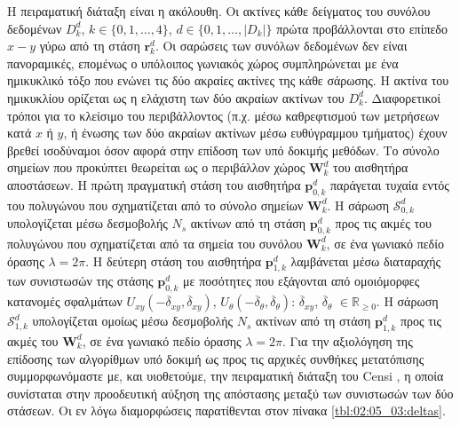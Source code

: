 Η πειραματική διάταξη είναι η ακόλουθη. Οι ακτίνες κάθε δείγματος του συνόλου
δεδομένων $D_k^d$, $k \in \{0,1,\dots,4\}$, $d \in \{0,1,\dots,|D_k|\}$ πρώτα
προβάλλονται στο επίπεδο $x-y$ γύρω από τη στάση $\bm{r}_k^d$. Οι σαρώσεις των
συνόλων δεδομένων δεν είναι πανοραμικές, επομένως ο υπόλοιπος γωνιακός χώρος
συμπληρώνεται με ένα ημικυκλικό τόξο που ενώνει τις δύο ακραίες ακτίνες της
κάθε σάρωσης. Η ακτίνα του ημικυκλίου ορίζεται ως η ελάχιστη των δύο ακραίων
ακτίνων του $D_k^d$. Διαφορετικοί τρόποι για το κλείσιμο του περιβάλλοντος
(π.χ.  μέσω καθρεφτισμού των μετρήσεων κατά $x$ ή $y$, ή ένωσης των δύο ακραίων
ακτίνων μέσω ευθύγραμμου τμήματος) έχουν βρεθεί ισοδύναμοι όσον αφορά στην
επίδοση των υπό δοκιμής μεθόδων. Το σύνολο σημείων που προκύπτει θεωρείται ως ο
περιβάλλον χώρος $\bm{W}_k^d$ του αισθητήρα αποστάσεων. Η πρώτη πραγματική
στάση του αισθητήρα $\bm{p}_{0,k}^d$ παράγεται τυχαία εντός του πολυγώνου που
σχηματίζεται από το σύνολο σημείων $\bm{W}_k^d$. Η σάρωση $\mathcal{S}_{0,k}^d$
υπολογίζεται μέσω δεσμοβολής $N_s$ ακτίνων από τη στάση $\bm{p}_{0,k}^d$ προς
τις ακμές του πολυγώνου που σχηματίζεται από τα σημεία του συνόλου
$\bm{W}_k^d$, σε ένα γωνιακό πεδίο όρασης $\lambda = 2\pi$. Η δεύτερη στάση του
αισθητήρα $\bm{p}_{1,k}^d$ λαμβάνεται μέσω διαταραχής των συνιστωσών της στάσης
$\bm{p}^d_{0,k}$ με ποσότητες που εξάγονται από ομοιόμορφες κατανομές σφαλμάτων
$U_{xy}(-\overline{\delta}_{xy}, \overline{\delta}_{xy})$,
$U_{\theta}(-\overline{\delta}_{\theta}, \overline{\delta}_{\theta})$:
$\overline{\delta}_{xy}$, $\overline{\delta}_\theta$ $\in \mathbb{R}_{\geq 0}$.
Η σάρωση $\mathcal{S}_{1,k}^d$ υπολογίζεται ομοίως μέσω δεσμοβολής $N_s$
ακτίνων από τη στάση $\bm{p}_{1,k}^d$ προς τις ακμές του $\bm{W}_k^d$, σε ένα
γωνιακό πεδίο όρασης $\lambda = 2\pi$.  Για την αξιολόγηση της επίδοσης των
αλγορίθμων υπό δοκιμή ως προς τις αρχικές συνθήκες μετατόπισης συμμορφωνόμαστε
με, και υιοθετούμε, την πειραματική διάταξη του Censi \cite{Censi2008a}, η
οποία συνίσταται στην προοδευτική αύξηση της απόστασης μεταξύ των συνιστωσών
των δύο στάσεων. Οι εν λόγω διαμορφώσεις παρατίθενται στον πίνακα
\ref{tbl:02:05_03:deltas}.


